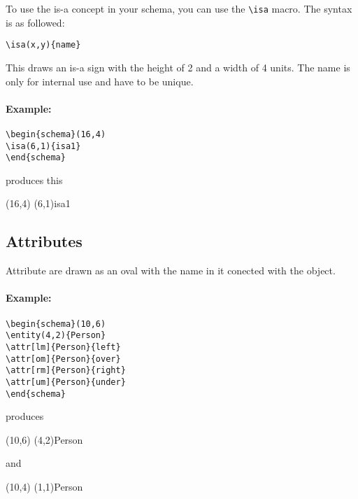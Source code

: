\documentclass[a4paper,11pt]{article}
\begin{document}
To use the is-a concept in your schema, you can use the \verb|\isa| macro.
The syntax is as followed:

\begin{verbatim}
\isa(x,y){name}
\end{verbatim}

This draws an is-a sign with the height of 2 and a width of 4 units.
The name is only for internal use and have to be unique.

\paragraph{Example:}

\begin{verbatim}
\begin{schema}(16,4)
\isa(6,1){isa1}
\end{schema}
\end{verbatim}

produces this

\begin{schema}(16,4)
\isa(6,1){isa1}
\end{schema}

\subsection{Attributes}

Attribute are drawn as an oval with the name in it conected with the object.

\paragraph{Example:}

\begin{verbatim}
\begin{schema}(10,6)
\entity(4,2){Person}
\attr[lm]{Person}{left}
\attr[om]{Person}{over}
\attr[rm]{Person}{right}
\attr[um]{Person}{under}
\end{schema}
\end{verbatim}

produces

\begin{schema}(10,6)
\entity(4,2){Person}
\end{schema}

and

\begin{schema}(10,4)
\entity(1,1){Person}
\end{schema}
\end{document}
